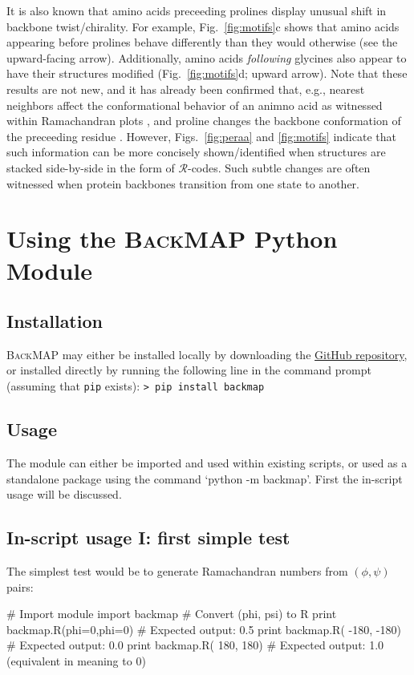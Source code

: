 \documentclass[fleqn,10pt,lineno]{wlpeerj} %
\newcommand{\Fig}[1]{Fig.~\ref{#1}}
\newcommand{\Figs}[1]{Figs.~\ref{#1}}
\newcommand{\n}[1]{{\color{red}#1}}
\newcommand{\gname}{BackMAP}
\newcommand{\pname}{\textsc{\gname}\xspace}
\newcommand{\code}[1]{\texttt{#1}\xspace}
\newcommand{\rr}{$\mathcal{R}$\xspace}
\begin{document}
It is also known that amino acids preceeding prolines display unusual shift in backbone twist/chirality. For example, \Fig{fig:motifs}c shows that amino acids appearing before prolines behave differently than they would otherwise \n{(see the upward-facing arrow)}. \n{Additionally, amino acids {\em following} glycines also appear to have their structures modified (\Fig{fig:motifs}d; upward arrow).} 
\n{Note that these results are not new, and it has already been confirmed that, e.g., nearest neighbors affect the conformational behavior of an animno acid as witnessed within Ramachandran plots \citep{Ting2010}, and proline changes the backbone conformation of the preceeding residue \citep{Gunasekaran1998,Ho2005}. %
However, \Figs{fig:peraa} and \ref{fig:motifs} indicate that such information can be more concisely shown/identified when structures are stacked side-by-side in the form of $\mathcal{R}$-codes.} Such subtle changes are often witnessed when protein backbones transition from one state to another.

\section*{Using the \pname Python Module}

\subsection*{Installation}
\pname may either be installed locally by downloading the \href{https://github.com/ranjanmannige/backmap}{GitHub repository}, or installed directly by running the following line in the command prompt (assuming that \code{pip} exists): \code{> pip install backmap}

\subsection*{Usage}
The module can either be imported and used within existing scripts, or used as a standalone package using the command `python -m backmap'. First the in-script usage will be discussed.

\subsection*{In-script usage I: first simple test}
The simplest test would be to generate Ramachandran numbers from $(\phi,\psi)$ pairs:
\begin{python}
# Import module
import backmap 
# Convert (phi, psi) to R
print backmap.R(phi=0,phi=0) # Expected output: 0.5
print backmap.R( -180, -180) # Expected output: 0.0
print backmap.R(  180,  180) # Expected output: 1.0 (equivalent in meaning to 0)
\end{python}
\end{document}

